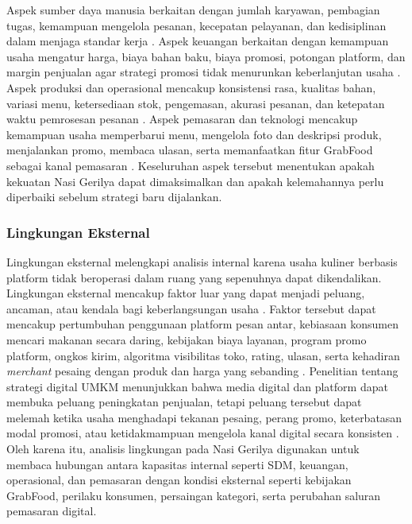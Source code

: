 Aspek sumber daya manusia berkaitan dengan jumlah karyawan, pembagian tugas, kemampuan mengelola pesanan, kecepatan pelayanan, dan kedisiplinan dalam menjaga standar kerja \parencite{wirtz2024servicesmarketing,david2023strategicmanagement}. Aspek keuangan berkaitan dengan kemampuan usaha mengatur harga, biaya bahan baku, biaya promosi, potongan platform, dan margin penjualan agar strategi promosi tidak menurunkan keberlanjutan usaha \parencite{kotler2023principlesmarketing,david2023strategicmanagement}. Aspek produksi dan operasional mencakup konsistensi rasa, kualitas bahan, variasi menu, ketersediaan stok, pengemasan, akurasi pesanan, dan ketepatan waktu pemrosesan pesanan \parencite{regina2025kuliner,sophia2025rendanggadih,ramadhanti2023rucika}. Aspek pemasaran dan teknologi mencakup kemampuan usaha memperbarui menu, mengelola foto dan deskripsi produk, menjalankan promo, membaca ulasan, serta memanfaatkan fitur GrabFood sebagai kanal pemasaran \parencite{chaffey2022digitalmarketing,khairani2022buahsayur,suharjo2020bogorsnacks}. Keseluruhan aspek tersebut menentukan apakah kekuatan Nasi Gerilya dapat dimaksimalkan dan apakah kelemahannya perlu diperbaiki sebelum strategi baru dijalankan.

\subsubsection{Lingkungan Eksternal}
Lingkungan eksternal melengkapi analisis internal karena usaha kuliner berbasis platform tidak beroperasi dalam ruang yang sepenuhnya dapat dikendalikan. Lingkungan eksternal mencakup faktor luar yang dapat menjadi peluang, ancaman, atau kendala bagi keberlangsungan usaha \parencite{pearce2013strategicmanagement,ramadhanti2023rucika}. Faktor tersebut dapat mencakup pertumbuhan penggunaan platform pesan antar, kebiasaan konsumen mencari makanan secara daring, kebijakan biaya layanan, program promo platform, ongkos kirim, algoritma visibilitas toko, rating, ulasan, serta kehadiran \textit{merchant} pesaing dengan produk dan harga yang sebanding \parencite{sophia2025rendanggadih,khairani2022buahsayur,ruhiyat2023minatbeli}. Penelitian tentang strategi digital UMKM menunjukkan bahwa media digital dan platform dapat membuka peluang peningkatan penjualan, tetapi peluang tersebut dapat melemah ketika usaha menghadapi tekanan pesaing, perang promo, keterbatasan modal promosi, atau ketidakmampuan mengelola kanal digital secara konsisten \parencite{regina2025kuliner,suharjo2020bogorsnacks,haliza2023seqapla}. Oleh karena itu, analisis lingkungan pada Nasi Gerilya digunakan untuk membaca hubungan antara kapasitas internal seperti SDM, keuangan, operasional, dan pemasaran dengan kondisi eksternal seperti kebijakan GrabFood, perilaku konsumen, persaingan kategori, serta perubahan saluran pemasaran digital.



